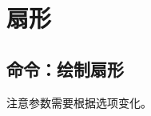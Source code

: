 \documentclass[../main.tex]{subfiles}
\begin{document}
\section{扇形}

\subsection{命令：绘制扇形}

\tkzHandBomb{}注意参数需要根据选项变化。
%
%
\end{document}
